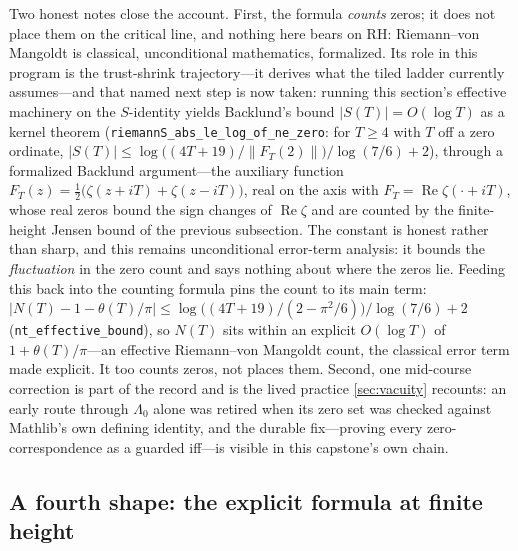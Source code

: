 Two honest notes close the account. First, the formula \emph{counts} zeros; it
does not place them on the critical line, and nothing here bears on RH:
Riemann--von Mangoldt is classical, unconditional mathematics, formalized. Its
role in this program is the trust-shrink trajectory---it derives what the
tiled ladder currently assumes---and that named next step is now taken: running this section's effective
machinery on the $S$-identity yields Backlund's bound $|S(T)| = O(\log T)$ as a
kernel theorem (\texttt{riemannS\_abs\_le\_log\_of\_ne\_zero}: for $T \ge 4$ with
$T$ off a zero ordinate,
$|S(T)| \le \log\!\big((4T{+}19)/\lVert F_T(2)\rVert\big)/\log(7/6) + 2$), through
a formalized Backlund argument---the auxiliary function
$F_T(z) = \tfrac12\big(\zeta(z{+}iT)+\zeta(z{-}iT)\big)$, real on the axis with
$F_T = \operatorname{Re}\zeta(\cdot{+}iT)$, whose real zeros bound the sign
changes of $\operatorname{Re}\zeta$ and are counted by the finite-height Jensen
bound of the previous subsection. The constant is honest rather than sharp, and
this remains unconditional error-term analysis: it bounds the \emph{fluctuation}
in the zero count and says nothing about where the zeros lie. Feeding this back
into the counting formula pins the count to its main term:
$|N(T) - 1 - \theta(T)/\pi| \le \log\!\big((4T{+}19)/(2-\pi^2/6)\big)/\log(7/6) + 2$
(\texttt{nt\_effective\_bound}), so $N(T)$ sits within an explicit $O(\log T)$ of
$1 + \theta(T)/\pi$---an effective Riemann--von Mangoldt count, the classical
error term made explicit. It too counts zeros, not places them. Second, one mid-course
correction is part of the record and is the lived practice
\cref{sec:vacuity} recounts: an early route through $\Lambda_0$ alone was
retired when its zero set was checked against Mathlib's own defining identity,
and the durable fix---proving every zero-correspondence as a guarded
iff---is visible in this capstone's own chain.

\subsection{A fourth shape: the explicit formula at finite height}

